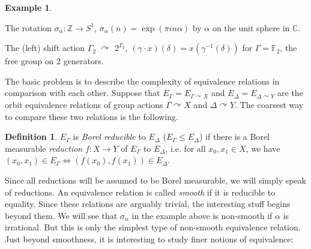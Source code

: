 \documentclass[10pt]{amsart}
\newcommand{\TT}{\mathbb{T}}
\newcommand{\FF}{\mathbb{F}}
\newcommand{\ZZ}{\mathbb{Z}}
\newcommand{\QQ}{\mathbb{Q}}
\newcommand{\RR}{\mathbb{R}}
\newcommand{\CCC}{\mathbb{C}}
\theoremstyle{definition}
\newtheorem*{definition*}{Definition}
\newtheorem*{example*}{Example}
\theoremstyle{remark}
\newenvironment{enumerate-(a)}{\begin{enumerate}[label={\upshape (\alph*)}, leftmargin=2pc]}{\end{enumerate}}
\begin{document}
\begin{example*} 
\begin{enumerate-(a)} 
\item 
The rotation $\sigma_\alpha\colon \ZZ\rightarrow S^1$, $\sigma_\alpha(n)=\exp(\pi i n \alpha)$ by $\alpha$ on the unit sphere in $\CCC$. 
\item 
The (left) shift action $\Gamma_2$ $\curvearrowright$ $2^{\Gamma_2}$, $(\gamma\cdot x)(\delta)=x(\gamma^{-1}(\delta))$ for $\Gamma=\FF_2$, the free group on 2 generators. 
\end{enumerate-(a)} 
\end{example*} 


The basic problem is to describe the complexity of equivalence relations in comparison with each other. 
Suppose that $E_\Gamma=E_{\Gamma\curvearrowright X}$ and $E_\Delta=E_{\Delta\curvearrowright Y}$ are the orbit equivalence relations of group actions $\Gamma\curvearrowright X$ and $\Delta\curvearrowright Y$. 
The coarsest way to compare these two relations is the following. 

\begin{definition*} 
$E_\Gamma$ is \emph{Borel reducible} to $E_\Delta$ ($E_\Gamma\leq E_\Delta$) if there is a Borel measurable \emph{reduction} $f\colon X\rightarrow Y$ of $E_\Gamma$ to $E_\Delta$, i.e. for all $x_0,x_1\in X$, we have 
$(x_0,x_1)\in E_\Gamma\Longleftrightarrow (f(x_0),f(x_1))\in E_\Delta$. 
\end{definition*} 

Since all reductions will be assumed to be Borel measurable, we will simply speak of reductions. 
An equivalence relation is called \emph{smooth} if it is reducible to equality. 
Since these relations are arguably trivial, the interesting stuff begins beyond them. 
We will see that $\sigma_\alpha$ in the example above is non-smooth if $\alpha$ is irrational. But this is only the simplest type of non-smooth equivalence relation. 
Just beyond smoothness, it is interesting to study finer notions of equivalence: 
\end{document}
